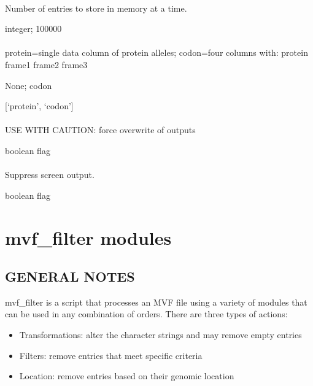\documentclass[letterpaper,11pt,english]{sphinxmanual}
\begin{document}
\subsubsection{}
\label{\detokenize{prog_desc:id155}}
 Number of entries to store in memory at a time.

 integer;  100000


\subsubsection{}
\label{\detokenize{prog_desc:id156}}
 protein=single data column of protein alleles; codon=four columns with: protein frame1 frame2 frame3

 None;  codon

 {[}‘protein’, ‘codon’{]}


\subsubsection{}
\label{\detokenize{prog_desc:id157}}
 USE WITH CAUTION: force overwrite of outputs

 boolean flag


\subsubsection{}
\label{\detokenize{prog_desc:id158}}
 Suppress screen output.

 boolean flag


\chapter{mvf\_filter modules}
\label{\detokenize{mvf_filter_modules::doc}}\label{\detokenize{mvf_filter_modules:mvf-filter-modules}}

\section{GENERAL NOTES}
\label{\detokenize{mvf_filter_modules:general-notes}}
mvf\_filter is a script that processes an MVF file using a variety
of modules that can be used in any combination of orders.  There
are three types of actions:
\begin{itemize}
\item {} 
Transformations: alter the character strings and may remove empty entries

\item {} 
Filters: remove entries that meet specific criteria

\item {} 
Location: remove entries based on their genomic location

\end{itemize}
\end{document}
